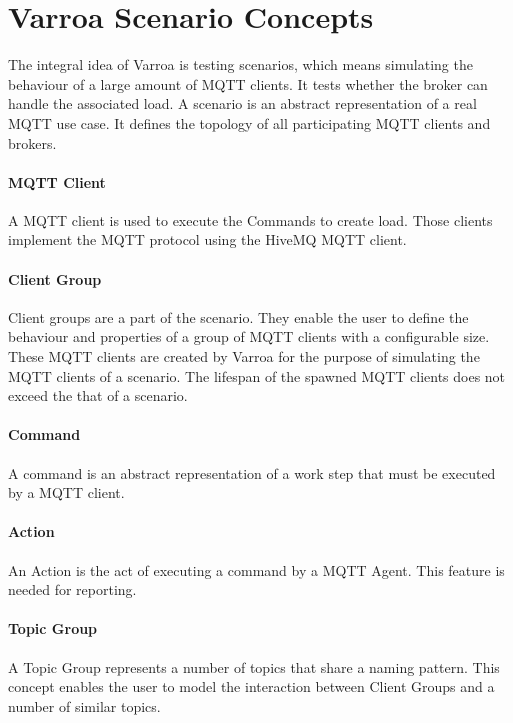 
\section{Varroa Scenario Concepts}
The integral idea of Varroa is testing scenarios, which means simulating the behaviour of a large amount of MQTT clients.
It tests whether the broker can handle the associated load.
A scenario is an abstract representation of a real MQTT use case.
It defines the topology of all participating MQTT clients and brokers.

\paragraph{MQTT Client}
A MQTT client is used to execute the Commands to create load.
Those clients implement the MQTT protocol using the HiveMQ MQTT client.

\paragraph{Client Group}
Client groups are a part of the scenario.
They enable the user to define the behaviour and properties of a group of MQTT clients with a configurable size.
These MQTT clients are created by Varroa for the purpose of simulating the MQTT clients of a scenario.
The lifespan of the spawned MQTT clients does not exceed the that of a scenario.

\paragraph{Command}
A command is an abstract representation of a work step that must be executed by a MQTT client.

\paragraph{Action}
An Action is the act of executing a command by a MQTT Agent.
This feature is needed for reporting.

\paragraph{Topic Group}
A Topic Group represents a number of topics that share a naming pattern.
This concept enables the user to model the interaction between Client Groups and a number of similar topics.


